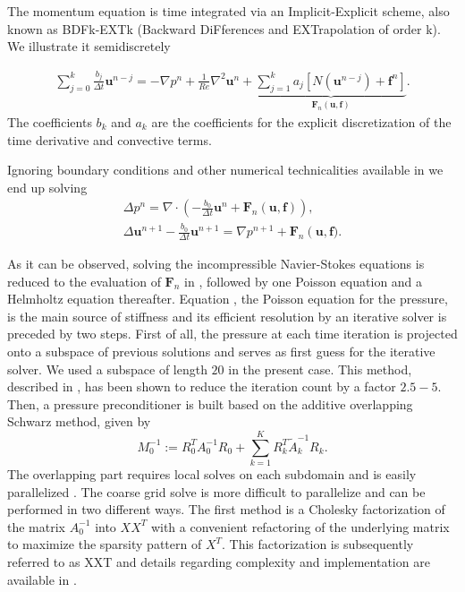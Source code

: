 \documentclass{sig-alternate}
\begin{document}
The momentum equation is time integrated via an Implicit-Explicit scheme, also known as BDFk-EXTk (Backward DiFferences and EXTrapolation of order k). We illustrate it semidiscretely

\begin{eqnarray}
\sum\limits_{j=0}^k \frac{b_j}{\Delta t} \mathbf u^{n-j}  = - \nabla p^{n}+\frac{1}{Re}\nabla^2\mathbf u^{n}+\underbrace{\sum\limits_{j=1}^k a_j [N(\mathbf u^{n-j})+\mathbf f^{n}]}_{\mathbf{F}_n(\mathbf u,\mathbf f)}.\label{eqn:discrete}
\end{eqnarray}
The coefficients $b_k$ and $a_k$ are the coefficients for the explicit discretization of the time derivative and convective terms.

Ignoring boundary conditions and other numerical technicalities available in \cite{Tomboulides1997} we end up solving
\begin{eqnarray}
 \Delta p^{n} = \nabla \cdot \left( -\frac{b_0}{\Delta t} \mathbf{u}^{n} + \mathbf{F}_n \left( \mathbf{u},\mathbf f \right) \right), \label{eqn:hmhz_pres}\\
 \Delta \mathbf{u}^{n+1}- \frac{b_0}{\Delta t} \mathbf{u}^{n+1}  =  \nabla p^{n+1} + \mathbf{F}_n \left( \mathbf{u}, \mathbf f) \right. . \label{eqn:hmhz_vel}
\end{eqnarray}

As it can be observed, solving the incompressible Navier-Stokes equations is reduced to the evaluation of $\mathbf{F}_n$ in , followed by one Poisson equation and a Helmholtz equation thereafter. 
Equation , the Poisson equation for the pressure, is the main source of stiffness and its efficient resolution by an iterative solver is preceded by two steps. First of all, the pressure at each time iteration is projected onto a subspace of previous solutions and serves as first guess for the iterative solver. We used a subspace of length $20$ in the present case. This method, described in \cite{Fischer1998}, has been shown to reduce the iteration count by a factor $2.5-5$. Then, a pressure preconditioner is built based on the additive overlapping Schwarz method, given by 
\begin{equation}
 M_0^{-1} := R_0^T A_{0}^{-1} R_0 + \sum_{k=1}^{K} R_k^T \tilde{A}_k^{-1} R_k.
\end{equation}
The overlapping part requires local solves on each subdomain and is easily parallelized \cite{Fischer199784,Fischer2005}. The coarse grid solve is more difficult to parallelize and can be performed in two different ways. The first method is a Cholesky factorization of the matrix $A_0^{-1}$ into $XX^T$ with a convenient refactoring of the underlying matrix to maximize the sparsity pattern of $X^T$. This factorization is subsequently referred to as XXT and details regarding complexity and implementation are available in \cite{Tufo2001151}. 
\end{document}
